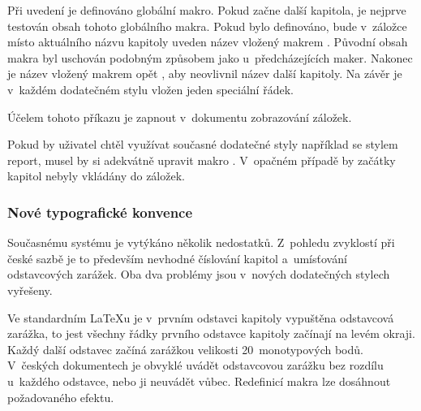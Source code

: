 \documentclass[12pt]{article}
\begin{document}
Při uvedení  je definováno globální makro. Pokud začne další
kapitola, je nejprve testován obsah tohoto globálního makra. 
Pokud bylo definováno, bude v~záložce místo aktuálního názvu kapitoly uveden
název vložený makrem . Původní obsah makra 
byl uschován podobným způsobem jako u~předcházejících maker.
Nakonec je název vložený makrem  opět , 
aby neovlivnil název další kapitoly. Na závěr je v~každém dodatečném
stylu vložen jeden speciální řádek.
\begin{flushleft}
\end{flushleft}
Účelem tohoto příkazu je zapnout v~dokumentu zobrazování záložek.

\medskip
Pokud by uživatel chtěl využívat současné dodatečné styly například se stylem 
\textsf{report}, musel by si adekvátně upravit makro .
V~opačném případě by začátky kapitol nebyly vkládány do záložek.

\subsubsection*{Nové typografické konvence}
Současnému systému \LaTeXE{} je vytýkáno několik nedostatků. 
Z~pohledu zvyklostí při české sazbě je to především nevhodné číslování kapitol 
a~umísťování odstavcových zarážek. Oba dva problémy jsou v~nových dodatečných
stylech vyřešeny.

\medskip
Ve standardním \LaTeX u je v~prvním odstavci kapitoly vypuštěna odstavcová
zarážka, to jest všechny řádky prvního odstavce kapitoly začínají na levém
okraji. Každý další odstavec začíná zarážkou velikosti 20~monotypových bodů.
V~českých dokumentech je obvyklé uvádět odstavcovou zarážku bez rozdílu
u~každého odstavce, nebo ji neuvádět vůbec. Redefinicí makra 
 lze dosáhnout požadovaného efektu.
\begin{flushleft}
\end{flushleft}
\end{document}
